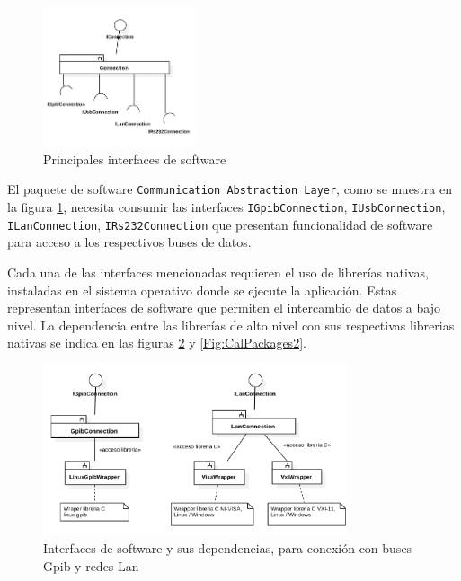 \documentclass[paper=a4,oneside,fontsize=12pt]{article}
\begin{document}
	\begin{figure}[H]
		\centering
		\includegraphics[width=0.4\textwidth]{Imagenes/CommunicationAbstractionLayerPackages1.pdf}
		\caption{Principales interfaces de software}
		\label{Fig:CalPackagesMain}
	\end{figure}
	
	El paquete de software \texttt{Communication~Abstraction~Layer}, como se muestra en la figura \ref{Fig:CalPackagesMain}, necesita consumir las interfaces \texttt{IGpibConnection}, \texttt{IUsbConnection}, \texttt{ILanConnection}, \texttt{IRs232Connection} que presentan funcionalidad de software para acceso a los respectivos buses de datos. 
	
	Cada una de las interfaces mencionadas requieren el uso de librerías nativas, instaladas en el sistema operativo donde se ejecute la aplicación. Estas representan interfaces de software que permiten el intercambio de datos a bajo nivel. La dependencia entre las librerías de alto nivel con sus respectivas librerias nativas se indica en las figuras \ref{Fig:CalPackages1} y \ref{Fig:CalPackages2}.

	\begin{figure}[H]
		\centering
		\includegraphics[width=0.8\textwidth]{Imagenes/CommunicationAbstractionLayerPackages2.pdf}
		\caption{Interfaces de software y sus dependencias, para conexión con buses Gpib y redes Lan}
		\label{Fig:CalPackages1}
	\end{figure}
\end{document}

